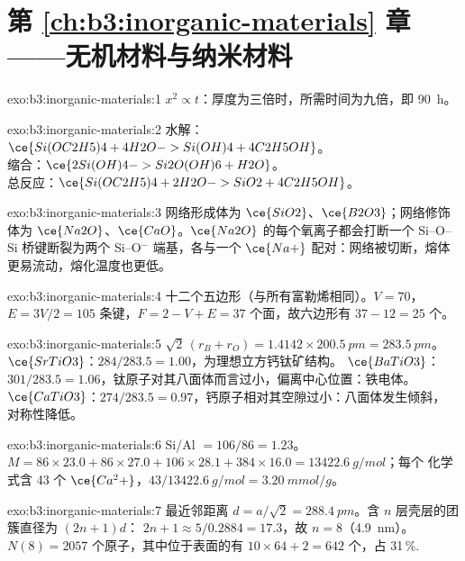 \section*{第 \ref{ch:b3:inorganic-materials} 章——无机材料与纳米材料}

\begin{solution}{exo:b3:inorganic-materials:1}
$x^2 \propto t$：厚度为三倍时，所需时间为九倍，即 \qty{90}{h}。
\end{solution}

\begin{solution}{exo:b3:inorganic-materials:2}
水解：$\ce{Si(OC2H5)4 + 4H2O -> Si(OH)4 + 4C2H5OH}$。\\
缩合：$\ce{2Si(OH)4 -> Si2O(OH)6 + H2O}$。\\
总反应：$\ce{Si(OC2H5)4 + 2H2O -> SiO2 + 4C2H5OH}$。
\end{solution}

\begin{solution}{exo:b3:inorganic-materials:3}
网络形成体为 $\ce{SiO2}$、$\ce{B2O3}$；网络修饰体为 $\ce{Na2O}$、$\ce{CaO}$。$\ce{Na2O}$ 的每个氧离子都会打断一个 Si--O--Si
桥键断裂为两个 Si--O$^-$ 端基，各与一个 $\ce{Na+}$ 配对：网络被切断，熔体
更易流动，熔化温度也更低。
\end{solution}

\begin{solution}{exo:b3:inorganic-materials:4}
十二个五边形（与所有富勒烯相同）。$V = 70$，$E = 3V/2 = 105$ 条键，$F = 2 - V + E = 37$
个面，故六边形有 $37 - 12 = 25$ 个。
\end{solution}

\begin{solution}{exo:b3:inorganic-materials:5}
$\sqrt2\,(r_B + r_O) = 1.4142 \times \qty{200.5}{pm} = \qty{283.5}{pm}$。$\ce{SrTiO3}$：$284/283.5 = 1.00$，为理想立方钙钛矿结构。
$\ce{BaTiO3}$：$301/283.5 = 1.06$，钛原子对其八面体而言过小，偏离中心位置：铁电体。
$\ce{CaTiO3}$：$274/283.5 = 0.97$，钙原子相对其空隙过小：八面体发生倾斜，
对称性降低。
\end{solution}

\begin{solution}{exo:b3:inorganic-materials:6}
Si/Al $= 106/86 = 1.23$。$M = 86 \times 23.0 + 86 \times 27.0 + 106 \times 28.1 + 384 \times 16.0 = \qty{13422.6}{g/mol}$；每个
化学式含 43 个 $\ce{Ca^2+}$，$43/\qty{13422.6}{g/mol} = \qty{3.20}{mmol/g}$。
\end{solution}

\begin{solution}{exo:b3:inorganic-materials:7}
最近邻距离 $d = a/\sqrt2 = \qty{288.4}{pm}$。含 $n$ 层壳层的团簇直径为 $(2n + 1)d$：
$2n + 1 \approx 5/0.2884 = 17.3$，故 $n = 8$（\qty{4.9}{nm}）。$N(8) = 2057$ 个原子，其中位于表面的有 $10 \times 64 + 2 = 642$ 个，占
31\,\%.
\end{solution}

